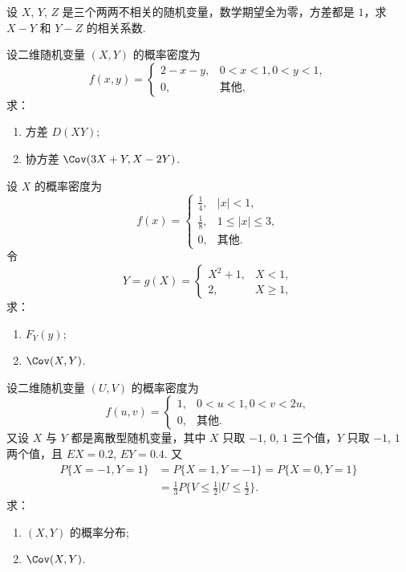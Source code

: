 	\begin{titwo}
		设 $X$, $Y$, $Z$ 是三个两两不相关的随机变量，数学期望全为零，方差都是 $1$，求 $X - Y$ 和 $Y - Z$ 的相关系数.
	\end{titwo}

	\begin{titwo}
		设二维随机变量 $(X,Y)$ 的概率密度为
		\[
			f(x,y) = \begin{cases}
				2 - x - y, & 0 < x < 1,0 < y < 1, \\
				0, & \text{其他},
			\end{cases}
		\]
		求：
		\begin{enumerate}
			\item 方差 $D(XY)$;
			\item 协方差 $\Cov(3X + Y, X - 2Y)$.
		\end{enumerate}
	\end{titwo}

	\begin{titwo}
		设 $X$ 的概率密度为
		\[
			f(x) = \begin{cases}
				\frac{1}{4}, & |x| < 1, \\
				\frac{1}{8}, & 1 \leq |x| \leq 3, \\
				0, & \text{其他}.
			\end{cases}
		\]
		令
		\[
			Y = g(X) = \begin{cases}
				X^{2} + 1, & X < 1, \\
				2, & X \geq 1,
			\end{cases}
		\]
		求：
		\begin{enumerate}
			\item $F_{Y}(y)$;
			\item $\Cov(X,Y)$.
		\end{enumerate}
	\end{titwo}

	\begin{titwo}
		设二维随机变量 $(U,V)$ 的概率密度为
		\[
			f(u,v) = \begin{cases}
				1, & 0 < u < 1, 0 < v < 2u, \\
				0, & \text{其他}.
			\end{cases}
		\]
		又设 $X$ 与 $Y$ 都是离散型随机变量，其中 $X$ 只取 $-1$, $0$, $1$ 三个值，$Y$ 只取 $-1$, $1$ 两个值，且 $EX = 0.2$, $EY = 0.4$. 又
		\begin{align*}
			P\{X = -1,Y = 1\} &= P\{X = 1,Y = -1\} = P\{X = 0,Y = 1\}\\
			&= \frac{1}{3} P\Biggl\{ V \leq \frac{1}{2} \Biggl| U \leq \frac{1}{2} \Biggr\}.
		\end{align*}
		求：
		\begin{enumerate}
			\item $(X,Y)$ 的概率分布;
			\item $\Cov(X,Y)$.
		\end{enumerate}
	\end{titwo}

